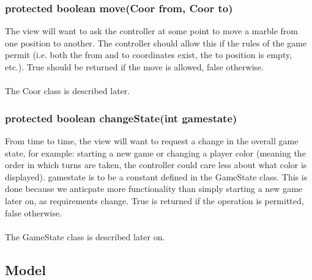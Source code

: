 \documentclass{article}
\begin{document}
\subsubsection*{protected boolean move(Coor from, Coor to)}
The view will want to ask the controller at some point to move a marble from one position to another. The controller should allow this if the rules of the game permit (i.e. both the from and to coordinates exist, the to position is empty, etc.). True should be returned if the move is allowed, false otherwise.\\\\

The Coor class is described later.

\subsubsection*{protected boolean changeState(int gamestate)}
From time to time, the view will want to request a change in the overall game state, for example: starting a new game or changing a player color (meaning the order in which turns are taken, the controller could care less about what color is displayed). gamestate is to be a constant defined in the GameState class. This is done because we anticpate more functionality than simply starting a new game later on, as requirements change. True is returned if the operation is permitted, false otherwise.\\\\


The GameState class is described later on.

\subsection{Model}
\\\\
\end{document}
